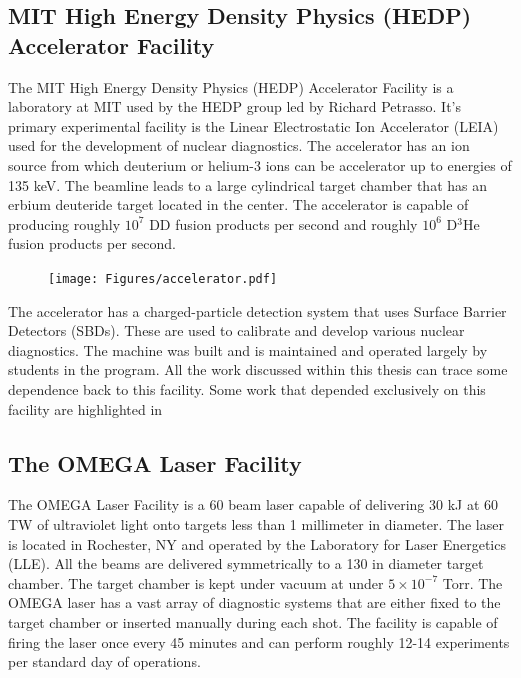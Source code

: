 
\subsection{MIT High Energy Density Physics (HEDP) Accelerator Facility}
\label{sec:LEIA}

	The MIT High Energy Density Physics (HEDP) Accelerator Facility is a laboratory at MIT used by the HEDP group led by Richard Petrasso. It's primary experimental facility is the Linear Electrostatic Ion Accelerator (LEIA) used for the development of nuclear diagnostics. The accelerator has an ion source from which deuterium or helium-3 ions can be accelerator up to energies of 135 keV. The beamline leads to a large cylindrical target chamber that has an erbium deuteride target located in the center. The accelerator is capable of producing roughly $10^7$ DD fusion products per second and roughly $10^6$ D$^3$He fusion products per second.
	
	\begin{figure}[h!]
		\centering
		\texttt{[image: Figures/accelerator.pdf]}
		\caption{}
	\end{figure}
	
	The accelerator has a charged-particle detection system that uses Surface Barrier Detectors (SBDs). These are used to calibrate and develop various nuclear diagnostics. The machine was built and is maintained and operated largely by students in the program. All the work discussed within this thesis can trace some dependence back to this facility. Some work that depended exclusively on this facility are highlighted in 

\subsection{The OMEGA Laser Facility}
\label{sec:OMEGA}

	The OMEGA Laser Facility is a 60 beam laser capable of delivering 30 kJ at 60 TW of ultraviolet light onto targets less than 1 millimeter in diameter. The laser is located in Rochester, NY and operated by the Laboratory for Laser Energetics (LLE). All the beams are delivered symmetrically to a 130 in diameter target chamber. The target chamber is kept under vacuum at under $5\times10^{-7}$ Torr. The OMEGA laser has a vast array of diagnostic systems that are either fixed to the target chamber or inserted manually during each shot. The facility is capable of firing the laser once every 45 minutes and can perform roughly 12-14 experiments per standard day of operations. 
	
